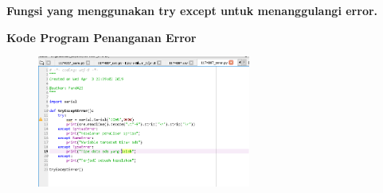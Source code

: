 \textbf{Fungsi yang menggunakan try except untuk menanggulangi error.}



\textbf{Kode Program Penanganan Error}
\begin{figure}[ht]
	\includegraphics[width=7cm]{figures/5/1174087/Praktek/1174087_error.png}
	\centering
\end{figure}
